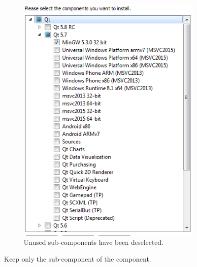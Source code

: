 \begin{figure} [h]
\begin{subfigure}{.5\textwidth}
  \includegraphics[width=.9\textwidth]{graphics/qt-setup-win-4.png}
  \caption{Unused sub-components have been deselected.}
\end{subfigure}%
\caption{Keep only the  sub-component of the  component.}
\label{fig:qt-setup-win-2}
\end{figure}

